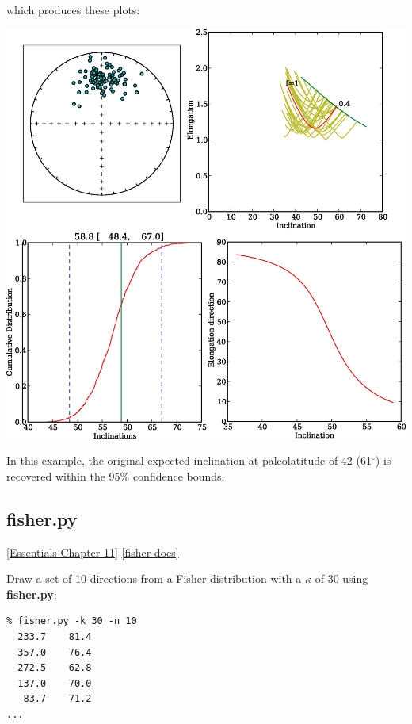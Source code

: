 \documentclass[11pt]{book}
\begin{document}
{{\begin{verbatim}
\end{verbatim}

\noindent which produces these plots:



\includegraphics[width=15cm]{EPSfiles/find_EI.eps}

In this example, the original expected inclination at paleolatitude of 42 (61$^{\circ}$) is recovered within the 95\% confidence bounds.

%

\subsection{fisher.py}
\href{http://earthref.org/MAGIC/books/Tauxe/Essentials/WebBook3ch11.html#ch11}{ [Essentials Chapter 11]}
\href{https://github.com/PmagPy/PmagPy/blob/master/programs/fisher.py}{[fisher docs]}

Draw a set of 10 directions from a Fisher distribution with a $\kappa$ of 30 using {\bf fisher.py}:

\begin{verbatim}
% fisher.py -k 30 -n 10
  233.7    81.4
  357.0    76.4
  272.5    62.8
  137.0    70.0
   83.7    71.2
...
  \end{verbatim}

}}
\end{document}
